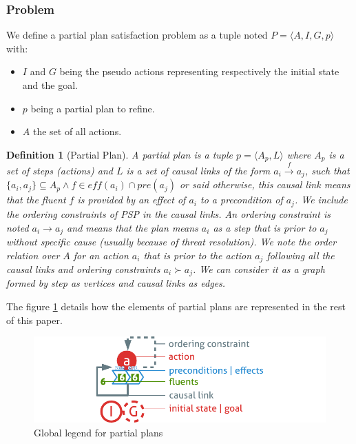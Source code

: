 \documentclass[]{article}
\providecommand{\tightlist}{%
  \setlength{\itemsep}{0pt}\setlength{\parskip}{0pt}}
\newtheorem{definition}{Definition}
\begin{document}
\subsubsection{Problem}\label{problem}

We define a partial plan satisfaction problem as a tuple noted
\(P = \langle A, I, G, p \rangle\) with:

\begin{itemize}
\tightlist
\item
  \(I\) and \(G\) being the pseudo actions representing respectively the
  initial state and the goal.
\item
  \(p\) being a partial plan to refine.
\item
  \(A\) the set of all actions.
\end{itemize}

\begin{definition}[Partial Plan]

A \emph{partial plan} is a tuple \(p = \langle A_p, L\rangle\) where
\(A_p\) is a set of steps (actions) and \(L\) is a set of causal links
of the form \(a_i \xrightarrow{f} a_j\), such that
\(\{ a_i, a_j \} \subseteq A_p \land f \in eff(a_i) \cap pre(a_j)\) or
said otherwise, this causal link means that the fluent \(f\) is provided
by an effect of \(a_i\) to a precondition of \(a_j\). We include the
ordering constraints of PSP in the causal links. An ordering constraint
is noted \(a_i \to a_j\) and means that the plan means \(a_i\) as a step
that is prior to \(a_j\) without specific cause (usually because of
threat resolution). We note the order relation over \(A\) for an action
\(a_i\) that is prior to the action \(a_j\) following all the causal
links and ordering constraints \(a_i \succ a_j\). We can consider it as
a graph formed by step as vertices and causal links as edges.

\end{definition}

The figure \ref{fig:legend} details how the elements of partial plans
are represented in the rest of this paper.

\begin{figure}[htbp]
\centering
\includegraphics{graphics/legend.pdf}
\caption{Global legend for partial plans\label{fig:legend}}
\end{figure}
\end{document}

